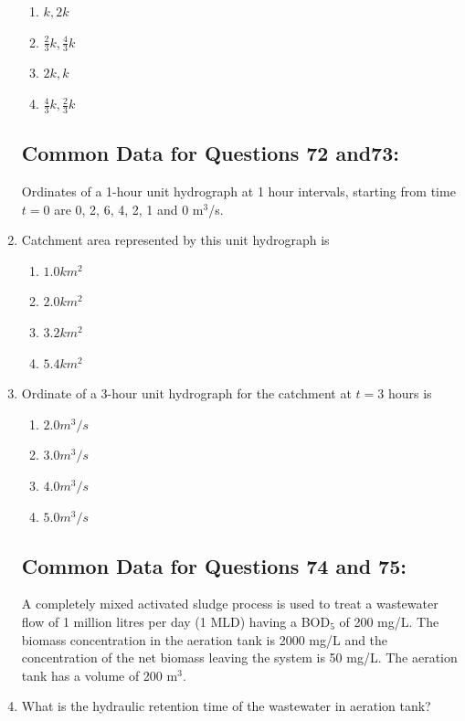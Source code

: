 \documentclass[journal,12pt,onecolumn]{IEEEtran}
\theoremstyle{remark}
\begin{document}
\begin{enumerate}
\hfill{}
\begin{enumerate}
\item $k,2k$
\item $\frac{2}{3}k,\frac{4}{3}k$
\item $2k,k$
\item $\frac{4}{3}k,\frac{2}{3}k$
\end{enumerate}

\subsection*{Common Data for Questions 72 and73:}
Ordinates of a 1-hour unit hydrograph at 1 hour intervals, starting from time $t=0$ are 0, 2, 6, 4, 2, 1 and 0 m$^3$/s.

\item Catchment area represented by this unit hydrograph is

\hfill{}
\begin{enumerate}
\item $1.0 km^2$
\item $2.0 km^2$
\item $3.2 km^2$
\item $5.4 km^2$
\end{enumerate}

\item Ordinate of a 3-hour unit hydrograph for the catchment at $t=3$ hours is

\hfill{}
\begin{enumerate}
\item $2.0 m^3/s$
\item $3.0 m^3/s$
\item $4.0 m^3/s$
\item $5.0 m^3/s$
\end{enumerate}

\subsection*{Common Data for Questions 74 and 75:}
A completely mixed activated sludge process is used to treat a wastewater flow of 1 million litres per day (1 MLD) having a BOD$_5$ of 200 mg/L. The biomass concentration in the aeration tank is 2000 mg/L and the concentration of the net biomass leaving the system is 50 mg/L. The aeration tank has a volume of 200 m$^3$.

\item What is the hydraulic retention time of the wastewater in aeration tank?


\end{enumerate}
\end{document}
